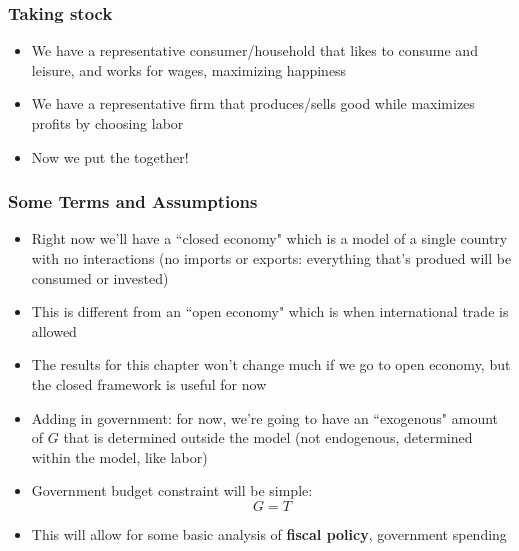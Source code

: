 \documentclass{beamer}
\author{Trevor S. Gallen}
\date{}
\begin{document}
\renewcommand*{\inserttotalframenumber}{\pageref{lastframe}}



\begin{frame}
\titlepage
\end{frame}

\begin{frame}
\frametitle[alignment=center]{Taking stock}
\begin{itemize}
\item We have a representative consumer/household that likes to consume and leisure, and works for wages, maximizing happiness
\bigskip
\item We have a representative firm that produces/sells good while maximizes profits by choosing labor
\bigskip
\item Now we put the together!
\end{itemize}
\end{frame}


\begin{frame}
\frametitle[alignment=center]{Some Terms and Assumptions}
\begin{itemize}
\item Right now we'll have a ``closed economy" which is a model of a single country with no interactions (no imports or exports:  everything that's produed will be consumed or invested)
\bigskip
\item This is different from an ``open economy" which is when international trade is allowed
\bigskip
\item The results for this chapter won't change much if we go to open economy, but the closed framework is useful for now
\bigskip
\item Adding in government:  for now, we're going to have an ``exogenous" amount of $G$ that is determined outside the model (not endogenous, determined within the model, like labor)
\item Government budget constraint will be simple:
$$G=T$$
\item This will allow for some basic analysis of \textbf{fiscal policy}, government spending
\end{itemize}
\end{frame}
\end{document}
